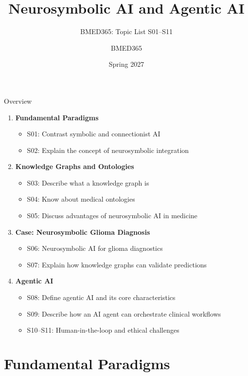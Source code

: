 \documentclass[aspectratio=169, 10pt]{beamer}
\title{Neurosymbolic AI and Agentic AI}
\subtitle{BMED365: Topic List S01--S11}
\author{BMED365}
\date{Spring 2027}
\begin{document}
\begin{frame}
    \titlepage
\end{frame}

\begin{frame}{Overview}
    \begin{enumerate}
        \item \textbf{Fundamental Paradigms}
        \begin{itemize}
            \item S01: Contrast symbolic and connectionist AI
            \item S02: Explain the concept of neurosymbolic integration
        \end{itemize}
        \item \textbf{Knowledge Graphs and Ontologies}
        \begin{itemize}
            \item S03: Describe what a knowledge graph is
            \item S04: Know about medical ontologies
            \item S05: Discuss advantages of neurosymbolic AI in medicine
        \end{itemize}
        \item \textbf{Case: Neurosymbolic Glioma Diagnosis}
        \begin{itemize}
            \item S06: Neurosymbolic AI for glioma diagnostics
            \item S07: Explain how knowledge graphs can validate predictions
        \end{itemize}
        \item \textbf{Agentic AI}
        \begin{itemize}
            \item S08: Define agentic AI and its core characteristics
            \item S09: Describe how an AI agent can orchestrate clinical workflows
            \item S10--S11: Human-in-the-loop and ethical challenges
        \end{itemize}
    \end{enumerate}
\end{frame}

\section{Fundamental Paradigms}
\end{document}
